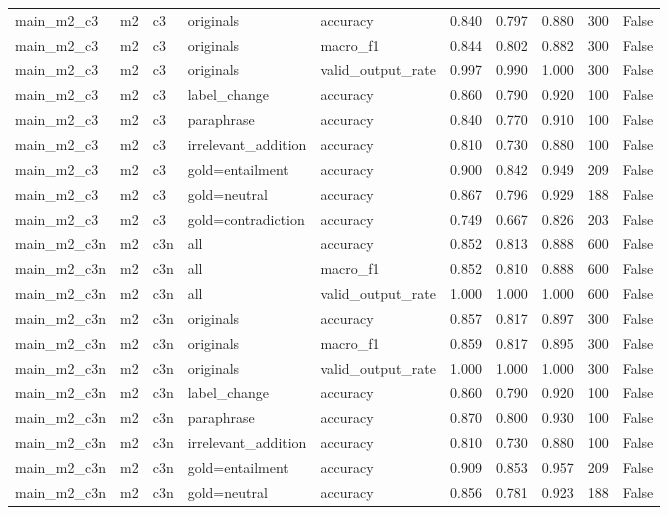 \begin{tabular}{llllllllll}
main\_m2\_c3 & m2 & c3 & originals & accuracy & 0.840 & 0.797 & 0.880 & 300 & False \\
main\_m2\_c3 & m2 & c3 & originals & macro\_f1 & 0.844 & 0.802 & 0.882 & 300 & False \\
main\_m2\_c3 & m2 & c3 & originals & valid\_output\_rate & 0.997 & 0.990 & 1.000 & 300 & False \\
main\_m2\_c3 & m2 & c3 & label\_change & accuracy & 0.860 & 0.790 & 0.920 & 100 & False \\
main\_m2\_c3 & m2 & c3 & paraphrase & accuracy & 0.840 & 0.770 & 0.910 & 100 & False \\
main\_m2\_c3 & m2 & c3 & irrelevant\_addition & accuracy & 0.810 & 0.730 & 0.880 & 100 & False \\
main\_m2\_c3 & m2 & c3 & gold=entailment & accuracy & 0.900 & 0.842 & 0.949 & 209 & False \\
main\_m2\_c3 & m2 & c3 & gold=neutral & accuracy & 0.867 & 0.796 & 0.929 & 188 & False \\
main\_m2\_c3 & m2 & c3 & gold=contradiction & accuracy & 0.749 & 0.667 & 0.826 & 203 & False \\
main\_m2\_c3n & m2 & c3n & all & accuracy & 0.852 & 0.813 & 0.888 & 600 & False \\
main\_m2\_c3n & m2 & c3n & all & macro\_f1 & 0.852 & 0.810 & 0.888 & 600 & False \\
main\_m2\_c3n & m2 & c3n & all & valid\_output\_rate & 1.000 & 1.000 & 1.000 & 600 & False \\
main\_m2\_c3n & m2 & c3n & originals & accuracy & 0.857 & 0.817 & 0.897 & 300 & False \\
main\_m2\_c3n & m2 & c3n & originals & macro\_f1 & 0.859 & 0.817 & 0.895 & 300 & False \\
main\_m2\_c3n & m2 & c3n & originals & valid\_output\_rate & 1.000 & 1.000 & 1.000 & 300 & False \\
main\_m2\_c3n & m2 & c3n & label\_change & accuracy & 0.860 & 0.790 & 0.920 & 100 & False \\
main\_m2\_c3n & m2 & c3n & paraphrase & accuracy & 0.870 & 0.800 & 0.930 & 100 & False \\
main\_m2\_c3n & m2 & c3n & irrelevant\_addition & accuracy & 0.810 & 0.730 & 0.880 & 100 & False \\
main\_m2\_c3n & m2 & c3n & gold=entailment & accuracy & 0.909 & 0.853 & 0.957 & 209 & False \\
main\_m2\_c3n & m2 & c3n & gold=neutral & accuracy & 0.856 & 0.781 & 0.923 & 188 & False \\

\end{tabular}
